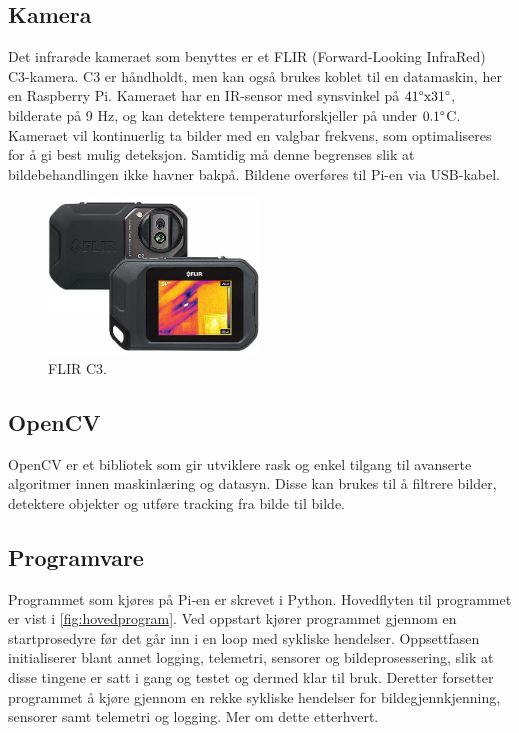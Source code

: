 
\subsection{Kamera}

Det infrarøde kameraet som benyttes er et FLIR (Forward-Looking InfraRed) C3-kamera. C3 er
håndholdt, men kan også brukes koblet til en datamaskin, her en Raspberry Pi. Kameraet har en IR-sensor med synsvinkel på $41\degree \text{x} 31\degree$, bilderate på 9 Hz, og kan detektere temperaturforskjeller på under $0.1\degree$C. Kameraet vil kontinuerlig ta bilder med en valgbar frekvens, som optimaliseres for å gi best mulig deteksjon. Samtidig må denne begrenses slik at bildebehandlingen ikke havner bakpå. Bildene overføres til Pi-en via USB-kabel.


\begin{figure}[H]
    \centering
    \includegraphics[width=0.5\textwidth]{implementering/c3.png}
    \caption{FLIR C3.}
    \label{fig:c3}
\end{figure}


\subsection{OpenCV}

OpenCV er et bibliotek som gir utviklere rask og enkel tilgang til avanserte algoritmer innen maskinlæring og datasyn. Disse kan brukes til å filtrere bilder, detektere objekter og utføre tracking fra bilde til bilde. 

\subsection{Programvare} 

Programmet som kjøres på Pi-en er skrevet i Python. Hovedflyten til programmet er vist i \autoref{fig:hovedprogram}. Ved oppstart kjører programmet gjennom en startprosedyre før det går inn i en loop med sykliske hendelser. Oppsettfasen initialiserer blant annet logging, telemetri, sensorer og bildeprosessering, slik at disse tingene er satt i gang og testet og dermed klar til bruk. Deretter forsetter programmet å kjøre gjennom en rekke sykliske hendelser for bildegjennkjenning, sensorer samt telemetri og logging. Mer om dette etterhvert.

